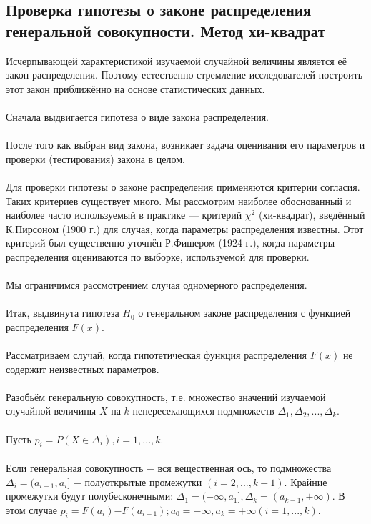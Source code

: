 \documentclass{article}
\begin{document}
\subsection{Проверка гипотезы о законе распределения генеральной совокупности. Метод хи-квадрат}
\noindent Исчерпывающей характеристикой изучаемой случайной величины является её закон распределения. Поэтому естественно стремление исследователей построить этот закон приближённо на основе статистических данных.
\\\\
Сначала выдвигается гипотеза о виде закона распределения.
\\\\
После того как выбран вид закона, возникает задача оценивания его параметров и проверки (тестирования) закона в целом.
\\\\
Для проверки гипотезы о законе распределения применяются критерии согласия. Таких критериев существует много. Мы рассмотрим наиболее обоснованный и наиболее часто используемый в практике — критерий $\chi^{2}$ (хи-квадрат), введённый К.Пирсоном (1900 г.) для случая, когда параметры распределения известны. Этот критерий был существенно уточнён Р.Фишером (1924 г.), когда параметры распределения оцениваются по выборке, используемой для проверки.
\\\\
Мы ограничимся рассмотрением случая одномерного распределения.
\\\\
Итак, выдвинута гипотеза $H_{0}$ о генеральном законе распределения с функцией распределения $F(x)$.
\\\\
Рассматриваем случай, когда гипотетическая функция распределения $F(x)$ не содержит неизвестных параметров.
\\\\
Разобьём генеральную совокупность, т.е. множество значений изучаемой случайной величины $X$ на $k$ непересекающихся подмножеств $\Delta_{1},\Delta_{2}, ... ,\Delta_{k}$.
\\\\
Пусть $p_{i} = P(X \in \Delta_{i}), i = 1, ... ,k$. 
\\\\
Если генеральная совокупность $-$ вся вещественная ось, то подмножества $\Delta_i = (a_{i-1},a_{i}]$ $-$ полуоткрытые промежутки $(i = 2, ... ,k-1)$. Крайние промежутки будут полубесконечными: $\Delta_{1} = (-\infty,a_{1}], \Delta_{k} = (a_{k-1},+\infty).$ В этом случае $p_{i} = F(a_{i})$$-$$F(a_{i-1}); a_{0} = -\infty, a_{k} = +\infty (i = 1, ... ,k).$
\end{document}
